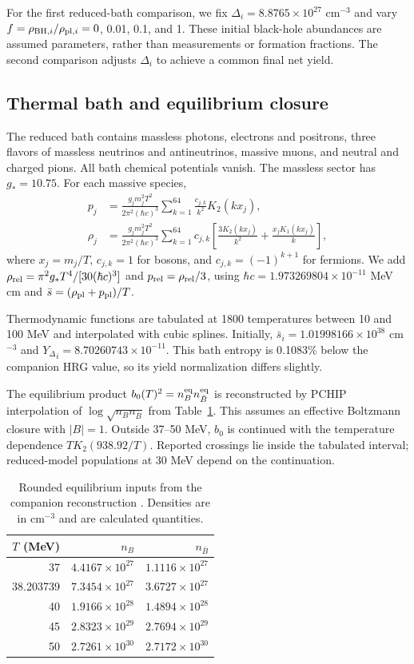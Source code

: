 \documentclass[10pt,a4paper,twocolumn]{article}
\newcommand{\Y}{{Y_\Delta}}
\newcommand{\sbar}{\bar s}
\begin{document}
For the first reduced-bath comparison, we fix $\Delta_i=8.8765\times10^{27}$ cm$^{-3}$ and vary $f=\rho_{{\rm BH},i}/\rho_{{\rm pl},i}=0$, 0.01, 0.1, and 1. These initial black-hole abundances are assumed parameters, rather than measurements or formation fractions. The second comparison adjusts $\Delta_i$ to achieve a common final net yield.

\subsection{Thermal bath and equilibrium closure}
The reduced bath contains massless photons, electrons and positrons, three flavors of massless neutrinos and antineutrinos, massive muons, and neutral and charged pions. All bath chemical potentials vanish. The massless sector has $g_*=10.75$. For each massive species,
\begin{align}
p_j&=\frac{g_jm_j^2T^2}{2\pi^2(\hbar c)^3}
\sum_{k=1}^{64}\frac{c_{j,k}}{k^2}K_2(kx_j),\\
\rho_j&=\frac{g_jm_j^2T^2}{2\pi^2(\hbar c)^3}
\sum_{k=1}^{64}c_{j,k}\left[\frac{3K_2(kx_j)}{k^2}+\frac{x_jK_1(kx_j)}{k}\right],
\end{align}
where $x_j=m_j/T$, $c_{j,k}=1$ for bosons, and $c_{j,k}=(-1)^{k+1}$ for fermions. We add $\rho_{\rm rel}=\pi^2g_*T^4/[30(\hbar c)^3]$ and $p_{\rm rel}=\rho_{\rm rel}/3$, using $\hbar c=1.973269804\times10^{-11}$ MeV cm and $\sbar=(\rho_{\rm pl}+p_{\rm pl})/T$.

Thermodynamic functions are tabulated at 1800 temperatures between 10 and 100 MeV and interpolated with cubic splines. Initially, $\sbar_i=1.01998166\times10^{38}$ cm$^{-3}$ and $\Y_i=8.70260743\times10^{-11}$. This bath entropy is 0.1083\% below the companion HRG value, so its yield normalization differs slightly.

The equilibrium product $b_0(T)^2=n_B^{\rm eq}n_{\bar B}^{\rm eq}$ is reconstructed by PCHIP interpolation of $\log\sqrt{n_Bn_{\bar B}}$ from Table~\ref{tab:input}. This assumes an effective Boltzmann closure with $|B|=1$. Outside 37--50 MeV, $b_0$ is continued with the temperature dependence $T K_2(938.92/T)$. Reported crossings lie inside the tabulated interval; reduced-model populations at 30 MeV depend on the continuation.

\begin{table}[t]
\centering\small
\caption{Rounded equilibrium inputs from the companion reconstruction \cite{garcia}. Densities are in cm$^{-3}$ and are calculated quantities.}\label{tab:input}
\begin{tabular}{rrr}\toprule
$T$ (MeV)&$n_B$&$n_{\bar B}$\\\midrule
37&$4.4167\times10^{27}$&$1.1116\times10^{27}$\\
38.203739&$7.3454\times10^{27}$&$3.6727\times10^{27}$\\
40&$1.9166\times10^{28}$&$1.4894\times10^{28}$\\
45&$2.8323\times10^{29}$&$2.7694\times10^{29}$\\
50&$2.7261\times10^{30}$&$2.7172\times10^{30}$\\\bottomrule
\end{tabular}
\end{table}
\end{document}
